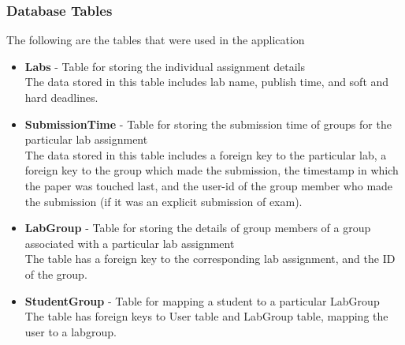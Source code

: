 \subsubsection{Database Tables}
The following are the tables that were used in the application
\begin{itemize}
\item \textbf{Labs} - Table for storing the individual assignment details\\
The data stored in this table includes lab name, publish time, and soft and hard deadlines.

\item \textbf{SubmissionTime} - Table for storing the submission time of groups for the particular lab assignment\\
The data stored in this table includes a foreign key to the particular lab, a foreign key to the group which made the submission, the timestamp in which the paper was touched last, and the user-id of the group member who made the submission (if it was an explicit submission of exam).

\item \textbf{LabGroup} - Table for storing the details of group members of a group associated with a particular lab assignment\\
The table has a foreign key to the corresponding lab assignment, and the ID of the group.

\item \textbf{StudentGroup} - Table for mapping a student to a particular LabGroup\\
The table has foreign keys to User table and LabGroup table, mapping the user to a labgroup.
\end{itemize}
